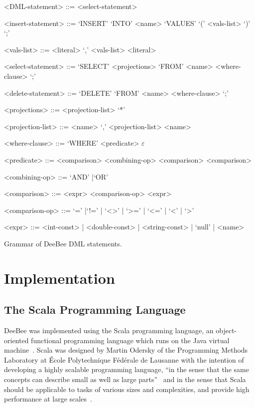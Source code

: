 \begin{listing}[h!]
\begin{grammar}
<DML-statement> ::= <select-statement>  

<insert-statement> ::= `INSERT' `INTO' <name> `VALUES' `(' <vals-list> `)' `;'

<vals-list> ::= <literal> `,' <vals-list> \alt <literal>

<select-statement> ::= `SELECT' <projections> `FROM' <name> <where-clause> `;'

<delete-statement> ::= `DELETE' `FROM' <name> <where-clause> `;'

<projections> ::= <projection-list> \alt `*'

<projection-list> ::= <name> `,' <projection-list> \alt <name>

<where-clause> ::= `WHERE' <predicate> \alt $\varepsilon$

<predicate> ::= <comparison> <combining-op> <comparison> \alt <comparison>

<combining-op> ::= `AND'  |`OR'

<comparison> ::= <expr> <comparison-op> <expr>

<comparison-op> ::= `=' |`!=' | `<>' | `>=' | `<='  | `<' | `>'

<expr> ::= <int-const> | <double-const> | <string-const> | `null' | <name>



\end{grammar}
\caption{Grammar of DeeBee DML statements.}
\label{lst:dml-grammar}
\end{listing}

\section{Implementation}

\subsection{The Scala Programming Language}

DeeBee was implemented using the Scala programming language, an object-oriented functional programming language which runs on the Java virtual machine~\cite{odersky2004scala,odersky2004overview,odersky2008programming}. Scala was designed by Martin Odersky of the Programming Methods Laboratory at \'Ecole Polytechnique F\'ed\'erale de Lausanne with the intention of developing a highly scalable programming language, ``in the sense that the same concepts can describe small as well as large parts''~\cite{odersky2004scala} and in the sense that Scala should be applicable to tasks of various sizes and complexities, and provide high performance at large scales~\cite{odersky2008programming}. 

